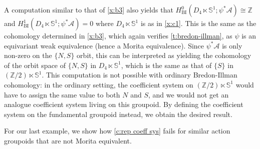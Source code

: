 \documentclass[12pt,reqno]{amsart}
\newcommand{\printname}[1]{}
\renewcommand{\printname}[1]
	{{\color{brown}{\makebox[0pt]{\hspace{-1in}\raisebox{8pt}{\tiny #1}}}}}
\newcommand{\labell}[1]{\label{#1} \printname{#1}}
\newcommand{\calA}{{\mathcal{A}}}
\renewcommand{\SS}{{\mathbb{S}}} %
\newcommand{\ZZ}{{\mathbb{Z}}}  %
\theoremstyle{plain}
\theoremstyle{definition}
\newenvironment{example}
		{\pushQED{\qed}\renewcommand{\qedsymbol}{$/\!\!/$}\examplex}
		{\popQED\endexamplex}
\newcommand{\BI}{{\operatorname{BI}}} %
\begin{document}
    \begin{example}[{\bf Groupoid C}]\labell{x:c3}
        A computation similar to that of \cref{x:b3} also yields that $H^0_\BI(D_4\ltimes\SS^1;\psi^*\calA)\cong\ZZ$ and $H^1_\BI(D_4\ltimes\SS^1;\psi^*\calA)=0$ where $D_4\ltimes\SS^1$ is as in \cref{x:c1}. This is the same as the cohomology determined in \cref{x:b3}, which again verifies \cref{t:bredon-illman}, as $\psi$ is an equivariant weak equivalence (hence a Morita equivalence).  Since $\psi^*\calA$ is only non-zero on   the $\{N,S\}$ orbit, this can be interpreted as yielding the cohomology of the orbit space of $\{N,S\}$ in $D_4\ltimes\SS^1$, which is the same as that of $\{S\}$ in $(\ZZ/2)\ltimes\SS^1$.  This computation is not possible with ordinary Bredon-Illman cohomology:  in the ordinary setting, the coefficient system on  $(\ZZ/2)\ltimes\SS^1$ would have to assign the same value to both $N$ and $S$, and we would not get an analogue coefficient system living on this groupoid.   By defining the coefficient system on the fundamental groupoid instead, we obtain the desired result.
    \end{example}

    For our last example, we show how \cref{c:rep coeff sys} fails for similar action groupoids that are not Morita equivalent.
\end{document}
